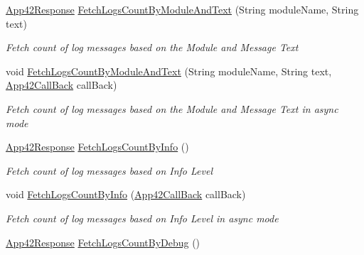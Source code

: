 \begin{DoxyCompactItemize}
\hyperlink{classcom_1_1shephertz_1_1app42_1_1paas_1_1sdk_1_1csharp_1_1_app42_response}{App42\+Response} \hyperlink{classcom_1_1shephertz_1_1app42_1_1paas_1_1sdk_1_1csharp_1_1log_1_1_log_service_a4c72700bcea1ea523be794f6d6d75b32}{Fetch\+Logs\+Count\+By\+Module\+And\+Text} (String module\+Name, String text)
\begin{DoxyCompactList}\small\item\em Fetch count of log messages based on the Module and Message Text \end{DoxyCompactList}\item 
void \hyperlink{classcom_1_1shephertz_1_1app42_1_1paas_1_1sdk_1_1csharp_1_1log_1_1_log_service_abcb991084cde8894e65f22c09dc4750b}{Fetch\+Logs\+Count\+By\+Module\+And\+Text} (String module\+Name, String text, \hyperlink{interfacecom_1_1shephertz_1_1app42_1_1paas_1_1sdk_1_1csharp_1_1_app42_call_back}{App42\+Call\+Back} call\+Back)
\begin{DoxyCompactList}\small\item\em Fetch count of log messages based on the Module and Message Text in async mode \end{DoxyCompactList}\item 
\hyperlink{classcom_1_1shephertz_1_1app42_1_1paas_1_1sdk_1_1csharp_1_1_app42_response}{App42\+Response} \hyperlink{classcom_1_1shephertz_1_1app42_1_1paas_1_1sdk_1_1csharp_1_1log_1_1_log_service_a9a76f5d62d75b3ae9256699e8d45a239}{Fetch\+Logs\+Count\+By\+Info} ()
\begin{DoxyCompactList}\small\item\em Fetch count of log messages based on Info Level \end{DoxyCompactList}\item 
void \hyperlink{classcom_1_1shephertz_1_1app42_1_1paas_1_1sdk_1_1csharp_1_1log_1_1_log_service_acacfeb5326bfe47aa96d5babd6103056}{Fetch\+Logs\+Count\+By\+Info} (\hyperlink{interfacecom_1_1shephertz_1_1app42_1_1paas_1_1sdk_1_1csharp_1_1_app42_call_back}{App42\+Call\+Back} call\+Back)
\begin{DoxyCompactList}\small\item\em Fetch count of log messages based on Info Level in async mode \end{DoxyCompactList}\item 
\hyperlink{classcom_1_1shephertz_1_1app42_1_1paas_1_1sdk_1_1csharp_1_1_app42_response}{App42\+Response} \hyperlink{classcom_1_1shephertz_1_1app42_1_1paas_1_1sdk_1_1csharp_1_1log_1_1_log_service_aadd09697253b115d91f7f1d55a574dec}{Fetch\+Logs\+Count\+By\+Debug} ()

\end{DoxyCompactItemize}
